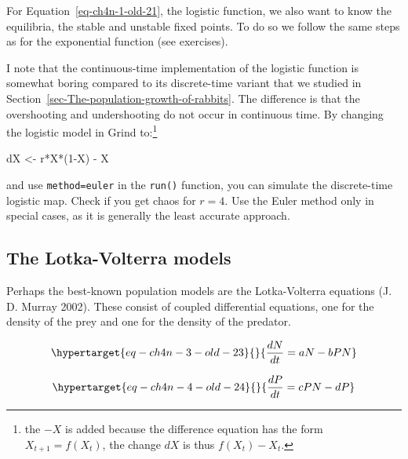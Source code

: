 \documentclass[
  a4paper,
  DIV=11,
  numbers=noendperiod,
  oneside]{scrreprt}
\newenvironment{Shaded}{\begin{snugshade}}{\end{snugshade}}
\newcommand{\DecValTok}[1]{\textcolor[rgb]{0.68,0.00,0.00}{#1}}
\newcommand{\NormalTok}[1]{\textcolor[rgb]{0.00,0.23,0.31}{#1}}
\newcommand{\OtherTok}[1]{\textcolor[rgb]{0.00,0.23,0.31}{#1}}
\newcommand{\SpecialCharTok}[1]{\textcolor[rgb]{0.37,0.37,0.37}{#1}}
\begin{document}
For Equation~\ref{eq-ch4n-1-old-21}, the logistic function, we also want
to know the equilibria, the stable and unstable fixed points. To do so
we follow the same steps as for the exponential function (see
exercises).

I note that the continuous-time implementation of the logistic function
is somewhat boring compared to its discrete-time variant that we studied
in Section~\ref{sec-The-population-growth-of-rabbits}. The difference is
that the overshooting and undershooting do not occur in continuous time.
By changing the logistic model in Grind to:\footnote{the \(-X\) is added
  because the difference equation has the form \(X_{t + 1} = f(X_{t})\),
  the change \(dX\) is thus \(f(X_{t})-X_{t}\).}

\begin{Shaded}
\begin{Highlighting}[]
\NormalTok{dX }\OtherTok{\textless{}{-}}\NormalTok{ r}\SpecialCharTok{*}\NormalTok{X}\SpecialCharTok{*}\NormalTok{(}\DecValTok{1}\SpecialCharTok{{-}}\NormalTok{X) }\SpecialCharTok{{-}}\NormalTok{ X }
\end{Highlighting}
\end{Shaded}

and use \texttt{method=\textquotesingle{}euler\textquotesingle{}} in the
\texttt{run()} function, you can simulate the discrete-time logistic
map. Check if you get chaos for \(r = 4\). Use the Euler method only in
special cases, as it is generally the least accurate approach.

\hypertarget{sec-The-LotkaVolterra-models}{%
\subsection{The Lotka-Volterra
models}\label{sec-The-LotkaVolterra-models}}

Perhaps the best-known population models are the Lotka-Volterra
equations (J. D. Murray 2002). These consist of coupled differential
equations, one for the density of the prey and one for the density of
the predator.

\begin{equation}\protect\hypertarget{eq-ch4n-3-old-23}{}{
\frac{dN}{dt} = aN - bPN
}\label{eq-ch4n-3-old-23}\end{equation}

\begin{equation}\protect\hypertarget{eq-ch4n-4-old-24}{}{
\frac{dP}{dt} = cPN - dP
}\label{eq-ch4n-4-old-24}\end{equation}
\end{document}
